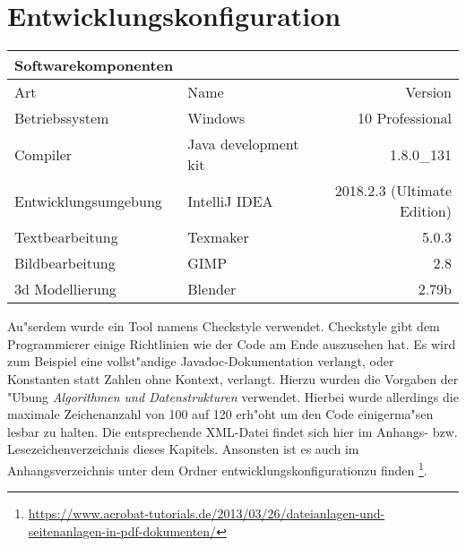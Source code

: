 \section{Entwicklungskonfiguration}
\label{sec:entwicklungskonfiguration}
\begin{table}[h!]
	\begin{tabular}{llr} 
	\toprule
	Softwarekomponenten\\  
	\midrule 
	Art & Name & Version\\ 
	\midrule 
	Betriebssystem & Windows & 10 Professional\\ 
	Compiler & Java development kit & 1.8.0\_131\\
  Entwicklungsumgebung & IntelliJ IDEA & 2018.2.3 (Ultimate Edition)\\
  Textbearbeitung & Texmaker & 5.0.3\\
  Bildbearbeitung & GIMP & 2.8\\
  3d Modellierung & Blender & 2.79b\\
	\bottomrule
	\end{tabular}
	\label{tab:ablaufbedingungen}
\end{table}
Au"serdem wurde ein Tool namens Checkstyle verwendet. Checkstyle gibt dem Programmierer einige 
Richtlinien wie der Code am Ende auszusehen hat. Es wird zum Beispiel eine vollst"andige Javadoc-Dokumentation
verlangt, oder Konstanten statt Zahlen ohne Kontext, verlangt. Hierzu wurden die Vorgaben der "Ubung 
\emph{Algorithmen und Datenstrukturen} verwendet. Hierbei wurde allerdings die maximale Zeichenanzahl von 100 auf 120 erh"oht um den Code einigerma"sen lesbar zu halten. Die entsprechende XML-Datei findet sich hier im Anhangs- bzw. Lesezeichenverzeichnis dieses Kapitels. Ansonsten ist es auch im Anhangsverzeichnis unter dem Ordner \glqq entwicklungskonfiguration\grqq zu finden
\footnote{\url{https://www.acrobat-tutorials.de/2013/03/26/dateianlagen-und-seitenanlagen-in-pdf-dokumenten/}}.


